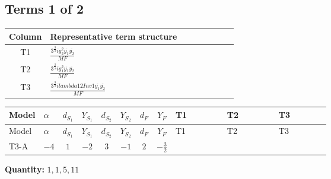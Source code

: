 \documentclass[8pt]{article}
\begin{document}
\begin{landscape}
\subsection*{Terms 1 of 2}
\begin{center}
\begin{tabular}{@{}c >{\raggedright\arraybackslash}p{0.82\linewidth}@{}}
\toprule
Column & Representative term structure \\
\midrule
T1 & \(\displaystyle \frac{3^{\frac{3}{4}} i g_{2}^{2} \overline{y_{1}} \overline{y_{2}}}{MF}\) \\
\midrule
T2 & \(\displaystyle \frac{3^{\frac{3}{4}} i g_{1}^{2} \overline{y_{1}} \overline{y_{2}}}{MF}\) \\
\midrule
T3 & \(\displaystyle \frac{3^{\frac{3}{4}} i lambda12Inv1 \overline{y_{1}} \overline{y_{2}}}{MF}\) \\
\midrule
\bottomrule
\end{tabular}
\end{center}
\smallskip
\tiny
\begin{longtable}{@{}llcccccc >{\raggedright\arraybackslash}p{0.21\linewidth} >{\raggedright\arraybackslash}p{0.21\linewidth} >{\raggedright\arraybackslash}p{0.21\linewidth}@{}}
\toprule
Model & $\alpha$ & $d_{S_1}$ & $Y_{S_1}$ & $d_{S_2}$ & $Y_{S_2}$ & $d_F$ & $Y_F$ & T1 & T2 & T3 \\
\midrule
\endfirsthead
\toprule
Model & $\alpha$ & $d_{S_1}$ & $Y_{S_1}$ & $d_{S_2}$ & $Y_{S_2}$ & $d_F$ & $Y_F$ & T1 & T2 & T3 \\
\midrule
\endhead
T3-A & $-4$ & $1$ & $-2$ & $3$ & $-1$ & $2$ & $-\frac{3}{2}$ & \scriptsize\adjustbox{max width=\linewidth}{$\begin{gathered} - \frac{17 \cdot 3^{\frac{3}{4}} i g_{2}^{2} \overline{y_{1}} \overline{y_{2}}}{24 MF}\end{gathered}$} & \scriptsize\adjustbox{max width=\linewidth}{$\begin{gathered} - \frac{9 \cdot 3^{\frac{3}{4}} i g_{1}^{2} \overline{y_{1}} \overline{y_{2}}}{8 MF}\end{gathered}$} & \scriptsize\adjustbox{max width=\linewidth}{$\begin{gathered} - \frac{3^{\frac{3}{4}} i lambda12Inv1 \overline{y_{1}} \overline{y_{2}}}{6 MF}\end{gathered}$} \\
\midrule
\bottomrule
\end{longtable}
\clearpage
\noindent\textbf{Quantity: }$\mathrm{1,1,5,11}$\par\smallskip

\end{landscape}
\end{document}
